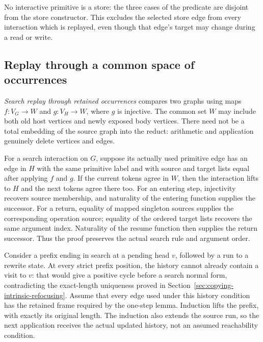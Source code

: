 


No interactive primitive is a store: the three cases of the predicate are
disjoint from the store constructor. This excludes the selected store edge
from every interaction which is replayed, even though that edge's target
may change during a read or write.


\subsection{Replay through a common space of occurrences}

\emph{Search replay through retained occurrences} compares two graphs using
maps $f:V_G\to W$ and $g:V_H\to W$, where $g$ is injective. The common set
$W$ may include both old host vertices and newly exposed body vertices. There
need not be a total embedding of the source graph into the reduct: arithmetic
and application genuinely delete vertices and edges.

For a search interaction on $G$, suppose its actually used primitive edge
has an edge in $H$ with the same primitive label and with source and target
lists equal after applying $f$ and $g$. If the current tokens agree in $W$,
then the interaction lifts to $H$ and the next tokens agree there too.
For an entering step, injectivity recovers source membership, and naturality
of the entering function supplies the successor. For a return, equality of
mapped singleton sources supplies the corresponding operation source;
equality of the ordered target lists recovers the same argument index.
Naturality of the resume function then supplies the return successor.
Thus the proof preserves the actual search rule and argument order.


Consider a prefix ending in search at a pending head $v$, followed by a run
to a rewrite state. At every strict prefix position, the history cannot
already contain a visit to $v$: that would give a positive cycle before a
search normal form, contradicting the exact-length uniqueness proved in
Section~\ref{sec:copying-intrinsic-refocusing}. Assume that every edge used
under this history condition has the retained frame required by the one-step
lemma. Induction lifts the prefix, with exactly its original length. The
induction also extends the source run, so the next application receives the
actual updated history, not an assumed reachability condition.

